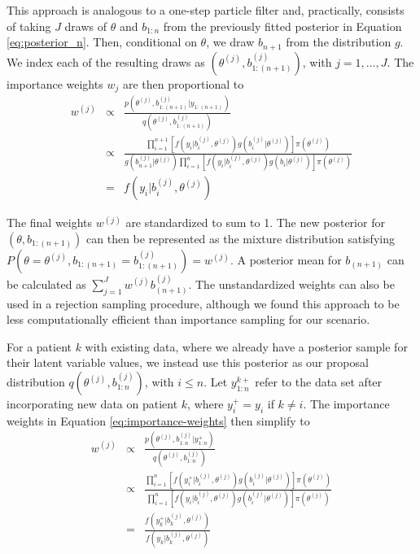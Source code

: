 \documentclass[letterpaper]{article}
\begin{document}
This approach is analogous to a one-step particle filter \cite{Bishop2006} and, practically, consists of taking $J$ draws of $\theta$ and $b_{1:n}$ from the previously fitted posterior in Equation \ref{eq:posterior_n}. Then, conditional on $\theta$, we draw $b_{n+1}$ from the distribution $g$. We index each of the resulting draws as $(\theta^{(j)},b_{1:(n+1)}^{(j)})$, with $j=1,\dots,J$. The importance weights $w_{j}$ are then proportional to 
\begin{eqnarray}
w^{(j)} & \propto & \frac{p(\theta^{(j)},b_{1:(n+1)}^{(j)}|y_{1:(n+1)})}{q(\theta^{(j)},b_{1:(n+1)}^{(j)})} \nonumber \\
 & \propto & \frac{\prod_{i=1}^{n+1}[f(y_{i}|b_{i}^{(j)},\theta^{(j)})g(b_{i}^{(j)}|\theta^{(j)})]\pi(\theta^{(j)})}{g(b_{n+1}^{(j)}|\theta^{(j)})\prod_{i=1}^{n}[f(y_{i}|b_{i}^{(j)},\theta^{(j)})g(b_{i}|\theta^{(j)})]\pi(\theta^{(j)})} \nonumber \\
\label{eq:importance-weights}
 & = & f(y_{i}|b_{i}^{(j)},\theta^{(j)})
\end{eqnarray}

The final weights $w^{(j)}$ are standardized to sum to 1. The new posterior for $(\theta,b_{1:(n+1)})$ can then be represented as the mixture distribution satisfying $P(\theta=\theta^{(j)},b_{1:(n+1)}=b_{1:(n+1)}^{(j)})=w^{(j)}$. A posterior mean for $b_{(n+1)}$ can be calculated as $\sum_{j=1}^{J}w^{(j)}b_{(n+1)}^{(j)}$. The unstandardized weights can also be used in a rejection sampling procedure, although we found this approach to be less computationally efficient than importance sampling for our scenario.


For a patient $k$ with existing data, where we already have a posterior sample for their latent variable values, we instead use this posterior as our proposal distribution $q(\theta^{(j)},b_{1:n}^{(j)})$, with $i\leq n$. Let $y_{1:n}^{k+}$ refer to the data set after incorporating new data on patient $k$, where $y_{i}^{+}=y_{i}$ if $k\neq i$. The importance weights in Equation \ref{eq:importance-weights} then simplify to
\begin{eqnarray*}
w^{(j)} & \propto & \frac{p(\theta^{(j)},b_{1:n}^{(j)}|y_{1:n}^{+})}{q(\theta^{(j)},b_{1:n}^{(j)})}\\
 & \propto & \frac{\prod_{i=1}^{n}[f(\ensuremath{y_{i}^{+}}|b_{i}^{(j)},\theta^{(j)})g(b_{i}^{(j)}|\theta^{(j)})]\pi(\theta^{(j)})}{\prod_{i=1}^{n}[f(\ensuremath{ y_{i} }|b_{i}^{(j)},\theta^{(j)})g(b_{i}^{(j)}|\theta^{(j)})]\pi(\theta^{(j)})}\\
 & = & \frac{f(\ensuremath{ y_{k}^{+}} |b_{ k }^{(j)},\theta^{(j)})}{f(\ensuremath{ y_{k}} |b_{k}^{(j)},\theta^{(j)})}
\end{eqnarray*}
\end{document}
